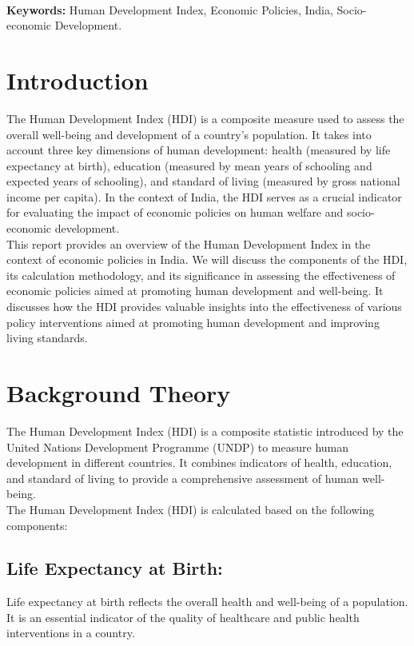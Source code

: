 \documentclass[12pt]{report}
\begin{document}
\textbf{\\Keywords:} Human Development Index, Economic Policies, India, Socio-economic Development.

\newpage
\section*{Introduction}
The Human Development Index (HDI)\cite{human} is a composite measure used to assess the overall well-being and development of a country's population. It takes into account three key dimensions of human development: health (measured by life expectancy at birth), education (measured by mean years of schooling and expected years of schooling), and standard of living (measured by gross national income per capita). In the context of India, the HDI serves as a crucial indicator for evaluating the impact of economic policies on human welfare and socio-economic development.\\

This report provides an overview of the Human Development Index in the context of economic policies in India. We will discuss the components of the HDI, its calculation methodology, and its significance in assessing the effectiveness of economic policies aimed at promoting human development and well-being. It discusses how the HDI provides valuable insights into the effectiveness of various policy interventions aimed at promoting human development and improving living standards.\cite{the}




\newpage
\section*{Background Theory}
The Human Development Index (HDI)\cite{the} is a composite statistic introduced by the United Nations Development Programme (UNDP) to measure human development in different countries. It combines indicators of health, education, and standard of living to provide a comprehensive assessment of human well-being.\\

The Human Development Index (HDI) is calculated based on the following components:
\subsection*{Life Expectancy at Birth:}  Life expectancy at birth reflects the overall health and well-being of a population. It is an essential indicator of the quality of healthcare and public health interventions in a country.
\end{document}
